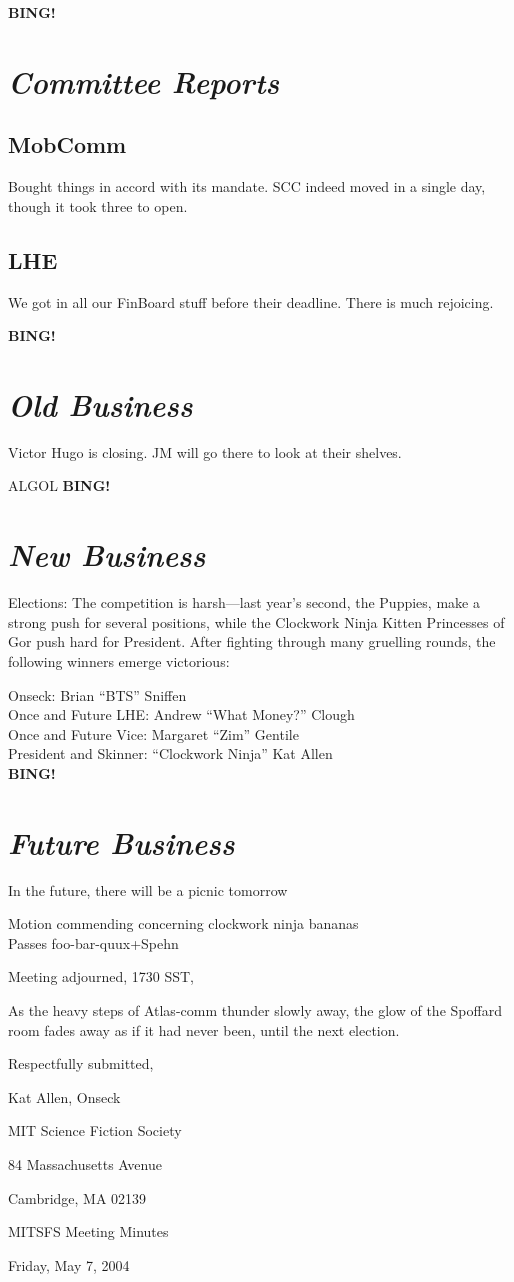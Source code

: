 \documentclass[10pt]{article}
\newcommand{\bing}{{\bf BING!} }
\newcommand{\goto}[1]{\bing \vskip 12pt \section*{{\em{#1}}}}
\begin{document}
\goto{Committee Reports}
\subsection*{MobComm}
Bought things in accord with its mandate.  SCC indeed moved in a
single day, though it took three to open.
\subsection*{LHE}
We got in all our FinBoard stuff before their deadline. There is much
rejoicing.

\goto{Old Business}
Victor Hugo is closing. JM will go there to look at their shelves.

ALGOL \goto{New Business} Elections: The competition is harsh---last
year's second, the Puppies, make a strong push for several positions,
while the Clockwork Ninja Kitten Princesses of Gor push hard for
President.  After fighting through many gruelling rounds, the
following winners emerge victorious: 

Onseck: Brian ``BTS''  Sniffen\\
Once and Future LHE: Andrew ``What Money?'' Clough\\
Once and Future Vice: Margaret ``Zim'' Gentile\\
President and Skinner: ``Clockwork Ninja'' Kat Allen\\


\goto{Future Business}
In the future, there will be a picnic tomorrow
\vspace{12pt}

Motion commending concerning clockwork ninja bananas\\
Passes foo-bar-quux+Spehn

\noindent
Meeting adjourned, 1730 SST,

As the heavy steps of Atlas-comm thunder slowly away, the glow of the
Spoffard room fades away as if it had never been, until the next
election.

\vspace{18pt}

\centerline{Respectfully submitted,}
\centerline{Kat Allen,  Onseck}

\begin{center}

MIT Science Fiction Society 

84 Massachusetts Avenue

Cambridge, MA 02139

\vspace{12pt}

MITSFS Meeting Minutes 

Friday, May 7, 2004

\end{center}
 
\end{document}
